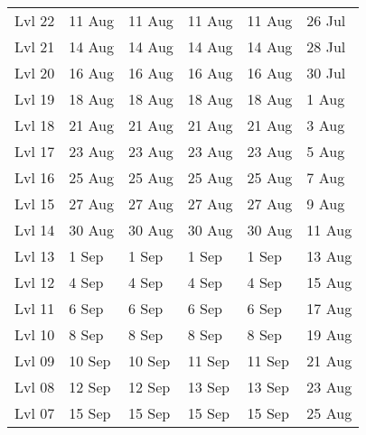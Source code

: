 \begin{table}[htbp]
\begin{tabular}{llllll}
Lvl 22  & 11 Aug   &11 Aug & 11 Aug        &11 Aug         &26 Jul\\
Lvl 21  & 14 Aug   &14 Aug  & 14 Aug        &14 Aug         &28 Jul\\
Lvl 20  & 16 Aug   &16 Aug          &16 Aug         &16 Aug         &30 Jul\\
Lvl 19  & 18 Aug   &18 Aug           &18 Aug         &18 Aug         &1 Aug\\
Lvl 18  & 21 Aug   &21 Aug & 21 Aug                  &21 Aug         &3 Aug\\
Lvl 17  & 23 Aug   &23 Aug  &23 Aug         &23 Aug         &5 Aug\\
Lvl 16  & 25 Aug   &25 Aug  &25 Aug         &25 Aug         &7 Aug\\
Lvl 15  & 27 Aug   &27 Aug  &27 Aug         &27 Aug         &9 Aug\\
Lvl 14  & 30 Aug   &30 Aug  &30 Aug         &30 Aug         &11 Aug\\
Lvl 13  & 1 Sep     &1 Sep    &1 Sep         &1 Sep         &13 Aug\\
Lvl 12  & 4 Sep     &4 Sep    & 4 Sep        &4 Sep         &15 Aug\\
Lvl 11  & 6 Sep     &6 Sep    & 6 Sep        &6 Sep         &17 Aug\\
Lvl 10  & 8 Sep     &8 Sep    & 8 Sep        &8 Sep         &19 Aug\\
Lvl 09  & 10 Sep   &10 Sep   & 11 Sep        &11 Sep         &21 Aug\\
Lvl 08  & 12 Sep   &12 Sep   & 13 Sep        &13 Sep         &23 Aug\\
Lvl 07  & 15 Sep   &15 Sep   & 15 Sep        &15 Sep         &25 Aug\\
\bottomrule
\end{tabular}
\normalsize
\end{table}



